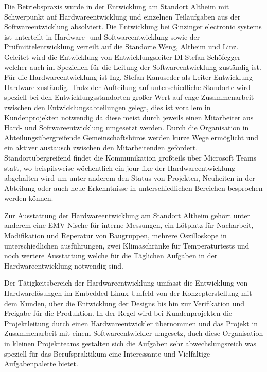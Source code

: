 \documentclass[praktikum,german]{hgbthesis}
\begin{document}


Die Betriebspraxis wurde in der Entwicklung am Standort Altheim mit Schwerpunkt auf Hardwareentwicklung und einzelnen Teilaufgaben aus der Softwareentwicklung absolviert. Die Entwicklung bei Ginzinger electronic systems ist unterteilt in Hardware- und Softwareentwicklung sowie der Prüfmittelentwicklung verteilt auf die Standorte Weng, Altheim und Linz. 
Geleitet wird die Entwicklung von Entwicklungsleiter DI Stefan Schöfegger welcher auch im Speziellen für die Leitung der Softwareentwicklung zuständig ist. Für die Hardwareentwicklung ist Ing. Stefan Kanuseder als Leiter Entwicklung Hardware zuständig. Trotz der Aufteilung auf unterschiedliche Standorte wird speziell bei den Entwicklungsstandorten großer Wert auf enge Zusammenarbeit zwischen den Entwicklungsabteilungen gelegt, dies ist vorallem in Kundenprojekten notwendig da diese meist durch jeweils einen Mitarbeiter aus Hard- und Softwareentwicklung umgesetzt werden. Durch die Organisation in Abteilungsübergreifende Gemeinschaftsbüros werden kurze Wege ermöglicht und ein aktiver austausch zwischen den Mitarbeitenden gefördert. Standortübergreifend findet die Kommunikation großteils über Microsoft Teams statt, wo beispilsweise wöchentlich ein jour fixe der Hardwareentwicklung abgehalten wird um unter anderem den Status von Projekten, Neuheiten in der Abteilung oder auch neue Erkenntnisse in unterschiedlichen Bereichen besprochen werden können. 

Zur Ausstattung der Hardwareentwicklung am Standort Altheim gehört unter anderem eine EMV Nische für interne Messungen, ein Lötplatz für Nacharbeit, Modifikation und Reperatur von Baugruppen, mehrere Oszilloskope in unterschiedlichen ausführungen, zwei Klimaschränke für Temperaturtests und noch wertere Ausstattung welche für die Täglichen Aufgaben in der Hardwareentwicklung notwendig sind.

Der Tätigkeitsbereich der Hardwareentwicklung umfasst die Entwicklung von Hardwarelösungen im Embedded Linux Umfeld von der Konzepterstellung mit dem Kunden, über die Entwicklung der Designs bis hin zur Verifikation und Freigabe für die Produktion. In der Regel wird bei Kundenprojekten die Projektleitung durch einen Hardwareentwickler übernommen und das Projekt in Zusammenarbeit mit einem Softwareentwickler umgesetz, duch diese Organisation in kleinen Projektteams gestalten sich die Aufgaben sehr abwechslungsreich was speziell für das Berufspraktikum eine Interessante und Vielfältige Aufgabenpalette bietet.
\end{document}
